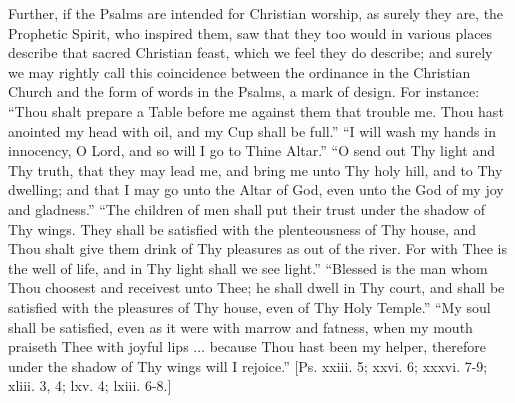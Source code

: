 Further, if the Psalms are intended for Christian worship, as
surely they are, the Prophetic Spirit, who inspired them, saw that
they too would in various places describe that sacred Christian feast,
which we feel they do describe; and surely we may rightly call this
coincidence between the ordinance in the Christian Church and the form
of words in the Psalms, a mark of design. For instance: ``Thou
shalt prepare a Table before me against them that trouble me. Thou
hast anointed my head with oil, and my Cup shall be full.''
``I will wash my hands in innocency, O Lord, and so will I go to
Thine Altar.'' ``O send out Thy light and Thy truth, that they
may lead me, and bring me unto Thy holy hill, and to Thy dwelling; and
that I may go unto the Altar of God, even unto the God of my joy and
gladness.'' ``The children of men shall put their trust under
the shadow of Thy wings. They shall be satisfied with the
plenteousness of Thy house, and Thou shalt give them drink of Thy
pleasures as out of the river. For with Thee is the well of life, and
in Thy light shall we see light.'' ``Blessed is the man whom
Thou choosest and receivest unto Thee; he shall dwell in Thy court,
and shall be satisfied with the pleasures of Thy house, even of Thy
Holy Temple.'' ``My soul shall be satisfied, even as it were
with marrow and fatness, when my mouth praiseth Thee with joyful lips
... because Thou hast been my helper, therefore under the shadow of
Thy wings will I rejoice.'' [Ps. xxiii. 5; xxvi. 6; xxxvi. 7-9;
xliii. 3, 4; lxv. 4; lxiii. 6-8.]

